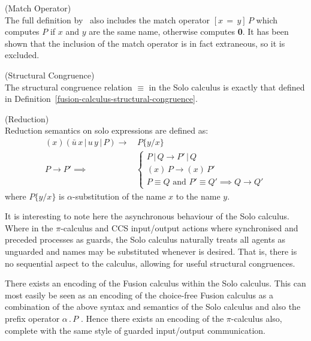     \begin{remark*}{(Match Operator)\\}
        The full definition by~\cite{solo-calculus} also includes the match operator $[x \, = \, y] \, P$ which computes $P$ if $x$ and $y$ are the same name, otherwise computes \textbf{0}.
        It has been shown that the inclusion of the match operator is in fact extraneous, so it is excluded.
    \end{remark*}


    \begin{definition}{(Structural Congruence)\\}
        The structural congruence relation $\equiv$ in the Solo calculus is exactly that defined in Definition~\ref{fusion-calculus-structural-congruence}.
    \end{definition}


    \begin{definition}{(Reduction)\\}
        Reduction semantics on solo expressions are defined as:
        \begin{align}
            (x)(\bar{u} \, x \, | \, u \, y \, | \, P) \rightarrow & \, P\{y / x\} \\
            P \rightarrow P' \implies &
            \begin{cases}
                P \, | \, Q \rightarrow P' \, | \, Q \\
                (x) \, P \rightarrow (x) \, P' \\
                P \equiv Q \text{ and } P' \equiv Q' \implies Q \rightarrow Q'
            \end{cases}
        \end{align}
        where $P\{y / x\}$ is $\alpha$-substitution of the name $x$ to the name $y$.
    \end{definition}
    It is interesting to note here the asynchronous behaviour of the Solo calculus.
    Where in the $\pi$-calculus and CCS input/output actions where synchronised and preceded processes as guards, the Solo calculus naturally treats all agents as unguarded and names may be substituted whenever is desired.
    That is, there is no sequential aspect to the calculus, allowing for useful structural congruences.


    \begin{remark*}
        There exists an encoding of the Fusion calculus within the Solo calculus.
        This can most easily be seen as an encoding of the choice-free Fusion calculus as a combination of the above syntax and semantics of the Solo calculus and also the prefix operator $\alpha \, . \, P$\footnotemark
        .
        Hence there exists an encoding of the $\pi$-calculus also, complete with the same style of guarded input/output communication.
    \end{remark*}






